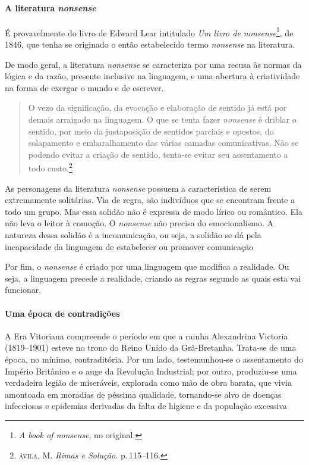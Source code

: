 \documentclass[11pt]{extarticle}
\begin{document}
\paragraph{A literatura \textit{nonsense}} É provavelmente do livro de Edward Lear intitulado
\textit{Um livro de \emph{nonsense}}\footnote{\textit{A book of \emph{nonsense}}, no original.},
de 1846, que tenha se originado o então estabelecido termo \textit{nonsense} na literatura. 

De modo geral, a literatura \textit{nonsense} se caracteriza por uma recusa
às normas da lógica e da razão, presente inclusive na linguagem, 
e uma abertura à criatividade na forma de exergar o mundo e de 
escrever. 

\begin{quote}
O vezo da significação, da evocação e elaboração de sentido já está por demais arraigado na
linguagem. O que se tenta fazer \textit{nonsense} é driblar o sentido, por meio da
justaposição de sentidos parciais e opostos, do solapamento e
embaralhamento das várias camadas comunicativas. Não se podendo evitar
a criação de sentido, tenta-se evitar seu assentamento a todo custo.\footnote{\textsc{ávila}, M. \textit{Rimas e Solução.}
p.\,115--116.}
\end{quote}


As personagens da literatura \textit{nonsense} possuem a característica
de serem extremamente solitárias. Via de regra, são indivíduos que se encontram
frente a todo um grupo. Mas essa solidão não é expressa de modo lírico ou romântico.
Ela não leva o leitor à comoção. O \textit{nonsense} não precisa do emocionalismo. 
A natureza dessa solidão é a incomunicação, ou seja, a solidão se dá pela incapacidade
da linguagem de estabelecer ou promover comunicação

Por fim, o \textit{nonsense} é criado por uma linguagem que modifica a realidade.
Ou seja, a linguagem precede a realidade, criando as regras segundo as quais
esta vai funcionar. 

\paragraph{Uma época de contradições}

A Era Vitoriana compreende o período em que a rainha Alexandrina Victoria (1819--1901)
esteve no trono do Reino Unido da Grã-Bretanha.
Trata-se de uma época, no mínimo, contraditória. Por um lado, testemunhou-se o
assentamento do Império Britânico e o auge da Revolução Industrial; por outro, produziu-se 
uma verdadeira legião de miseráveis, explorada como mão de obra barata, que vivia amontoada 
em moradias de péssima qualidade, tornando-se alvo de doenças infecciosas e epidemias derivadas da 
falta de higiene e da população excessiva
\end{document}
